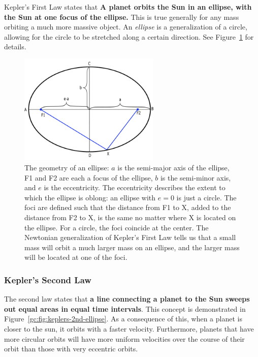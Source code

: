 Kepler’s First Law states that \textbf{A planet orbits the Sun in an ellipse, with the Sun at one focus
of the ellipse.} This is true generally for any mass orbiting a much more massive object. An \textit{ellipse} is a
generalization of a circle, allowing for the circle to be stretched along a certain direction. See Figure~\ref{gc:fig:ellipse} for details.

\begin{figure}
	\centering
	\includegraphics[width=0.6\textwidth]{galactic-center/ellipse.png}
	\caption{The geometry of an ellipse: $a$ is the semi-major axis of the ellipse, F1 and F2 are each a
		focus of the ellipse, $b$ is the semi-minor axis, and $e$ is the eccentricity. The eccentricity describes
		the extent to which the ellipse is oblong: an ellipse with $e = 0$ is just a circle. The foci are defined such
		that the distance from F1 to X, added to the distance from F2 to X, is the same no matter where X
		is located on the ellipse. For a circle, the foci coincide at the center. The Newtonian generalization of
		Kepler's First Law tells us that a small mass will orbit a much larger mass on an ellipse, and the larger
		mass will be located at one of the foci.}\label{gc:fig:ellipse}
\end{figure}

\subsubsection{Kepler's Second Law}

The second law states that \textbf{a line connecting a planet to the Sun sweeps out equal areas in
equal time intervals}. This concept is demonstrated in Figure~\ref{gc:fig:keplers-2nd-ellipse}. As a consequence of this, when a
planet is closer to the sun, it orbits with a faster velocity. Furthermore, planets that have more circular
orbits will have more uniform velocities over the course of their orbit than those with very eccentric
orbits.

